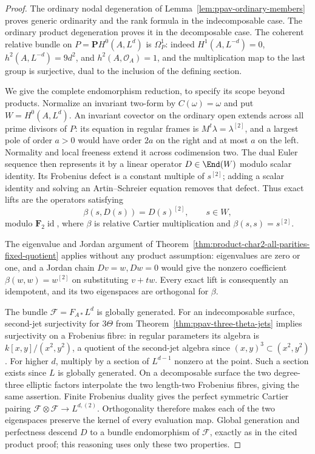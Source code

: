 \begin{proof}
The ordinary nodal degeneration of Lemma~\ref{lem:ppav-ordinary-members}
proves generic ordinarity and the rank formula in the indecomposable case.
The ordinary product degeneration proves it in the decomposable case.
The coherent relative bundle on $P=\mathbf P H^0(A,L^d)$ is $\Omega_P^1$:
indeed $H^1(A,L^{-d})=0$, $h^2(A,L^{-d})=9d^2$, and
$h^2(A,\mathcal O_A)=1$, and the multiplication map to the last group is
surjective, dual to the inclusion of the defining section.

We give the complete endomorphism reduction, to specify its scope beyond
products. Normalize an invariant two-form by $C(\omega)=\omega$ and put
$W=H^0(A,L^d)$. An invariant covector on the ordinary open extends across
all prime divisors of $P$: its equation in regular frames is
$M^t\lambda=\lambda^{[2]}$, and a largest pole of order $a>0$ would have
order $2a$ on the right and at most $a$ on the left. Normality and local
freeness extend it across codimension two. The dual Euler sequence then
represents it by a linear operator $D\in\End(W)$ modulo scalar identity.
Its Frobenius defect is a constant multiple of $s^{[2]}$; adding a scalar
identity and solving an Artin--Schreier equation removes that defect.
Thus exact lifts are the operators satisfying
\[
                 \beta(s,D(s))=D(s)^{[2]},\qquad s\in W,
\]
modulo $\mathbf F_2\operatorname{id}$, where $\beta$ is relative Cartier
multiplication and $\beta(s,s)=s^{[2]}$.

The eigenvalue and Jordan argument of
Theorem~\ref{thm:product-char2-all-parities-fixed-quotient} applies without
any product assumption: eigenvalues are zero or one, and a Jordan chain
$Dv=w,Dw=0$ would give the nonzero coefficient $\beta(w,w)=w^{[2]}$ on
substituting $v+tw$. Every exact lift is consequently an idempotent, and
its two eigenspaces are orthogonal for $\beta$.

The bundle $\mathcal F=F_{A*}L^d$ is globally generated. For an
indecomposable surface, second-jet surjectivity for $3\Theta$ from
Theorem~\ref{thm:ppav-three-theta-jets} implies surjectivity on a
Frobenius fibre: in regular parameters its algebra is
$k[x,y]/(x^2,y^2)$, a quotient of the second-jet algebra since
$(x,y)^3\subset(x^2,y^2)$. For higher $d$, multiply by a section of
$L^{d-1}$ nonzero at the point. Such a section exists since $L$ is globally
generated. On a decomposable surface the two degree-three elliptic factors
interpolate the two length-two Frobenius fibres, giving the same assertion.
Finite Frobenius duality gives the perfect symmetric Cartier pairing
$\mathcal F\otimes\mathcal F\to L^{d,(2)}$.
Orthogonality therefore makes each of the two eigenspaces preserve the
kernel of every evaluation map. Global generation and perfectness descend
$D$ to a bundle endomorphism of $\mathcal F$, exactly as in the cited
product proof; this reasoning uses only these two properties.


\end{proof}
